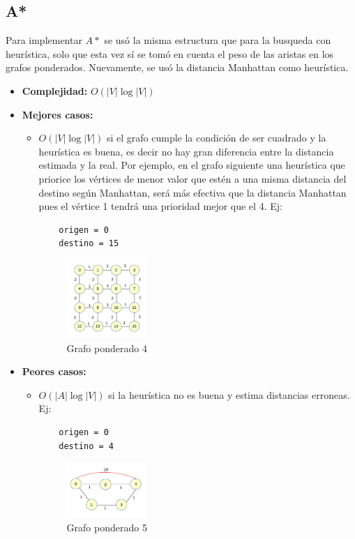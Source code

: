 \documentclass[a4paper,10pt]{article}
\begin{document}
\subsection{A*}

Para implementar $A*$ se usó la misma estructura que para la busqueda con heurística, solo que esta vez sí se tomó en cuenta el peso de las aristas en los grafos ponderados. Nuevamente, se usó la distancia Manhattan como heurística.

\begin{itemize}
\item \textbf{Complejidad:} $O(|V| \log{|V|})$
\item \textbf{Mejores casos:}
	\begin{itemize}
	\item $O(|V| \log{|V|})$ si el grafo cumple la condición de ser cuadrado y la heurística es buena, es decir no hay gran diferencia entre la distancia estimada y la real. Por ejemplo, en el grafo siguiente una heurística que priorice los vértices de menor valor que estén a una misma distancia del destino según Manhattan, será más efectiva que la distancia Manhattan pues el vértice 1 tendrá una prioridad mejor que el 4. Ej:
	\begin{verbatim}
	origen = 0
	destino = 15
	\end{verbatim}
	\begin{figure}[H]
	\begin{center}
	\includegraphics[width=0.3\textwidth]{./g10.png}
	\caption{Grafo ponderado 4}
	\label{fig:g10}
	\end{center}
	\end{figure}
	\end{itemize}
\item \textbf{Peores casos:}
	\begin{itemize}
	\item $O(|A| \log{|V|})$ si la heurística no es buena y estima distancias erroneas. Ej:
	\begin{verbatim}
	origen = 0
	destino = 4
	\end{verbatim}
	\begin{figure}[H]
	\begin{center}
	\includegraphics[width=0.3\textwidth]{./g9.png}
	\caption{Grafo ponderado 5}
	\label{fig:g9}
	\end{center}
	\end{figure}
	\end{itemize}
\end{itemize}
\end{document}

